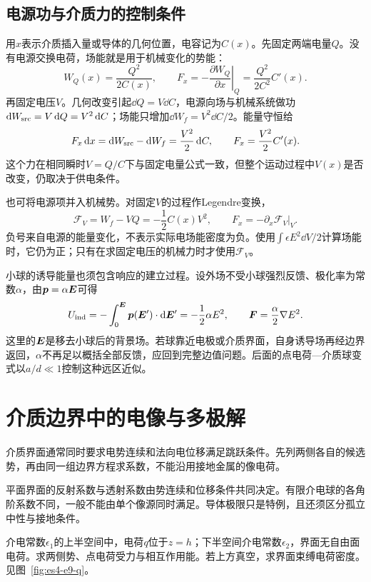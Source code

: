 \subsection{电源功与介质力的控制条件}\label{sec:es-energy-control}
用$x$表示介质插入量或导体的几何位置，电容记为$C(x)$。先固定两端电量$Q$。没有电源交换电荷，场能就是用于机械变化的势能：
\[W_Q(x)=\frac{Q^2}{2C(x)},\qquad
F_x=-\left.\frac{\partial W_Q}{\partial x}\right|_Q
=\frac{Q^2}{2C^2}C'(x).
\]
再固定电压$V$。几何改变引起$\dd Q=V\dd C$，电源向场与机械系统做功$\mathop{}\!\mathrm d W_{\rm src}=V\mathop{}\!\mathrm d Q=V^2\mathop{}\!\mathrm d C$；场能只增加$\dd W_f=V^2\dd C/2$。能量守恒给
\[F_x\mathop{}\!\mathrm d x=\mathop{}\!\mathrm d W_{\rm src}-\mathop{}\!\mathrm d W_f
=\frac{V^2}{2}\mathop{}\!\mathrm d C,
\qquad F_x=\frac{V^2}{2}C'(x).
\]
这个力在相同瞬时$V=Q/C$下与固定电量公式一致，但整个运动过程中$V(x)$是否改变，仍取决于供电条件。

也可将电源项并入机械势。对固定$V$的过程作Legendre变换，
\[\mathcal F_V=W_f-VQ=-\frac12C(x)V^2,
\qquad F_x=-\left.\partial_x\mathcal F_V\right|_V.
\]
负号来自电源的能量变化，不表示实际电场能密度为负。使用$\int\epsilon E^2\dd V/2$计算场能时，它仍为正；只有在求固定电压的机械力时才使用$\mathcal F_V$。

小球的诱导能量也须包含响应的建立过程。设外场不受小球强烈反馈、极化率为常数$\alpha$，由$\bm{p}=\alpha\bm{E}$可得
\[U_{\rm ind}=-\int_0^{\bm{E}}\bm{p}(\bm{E}')\cdot\mathop{}\!\mathrm d\bm{E}'
=-\frac12\alpha E^2,
\qquad \bm{F}=\frac\alpha2\nabla E^2.
\]
这里的$\bm{E}$是移去小球后的背景场。若球靠近电极或介质界面，自身诱导场再经边界返回，$\alpha$不再足以概括全部反馈，应回到完整边值问题。后面的点电荷—介质球变式以$a/d\ll1$控制这种远区近似。



\section{介质边界中的电像与多极解}\label{sec:es4-images}
介质界面通常同时要求电势连续和法向电位移满足跳跃条件。先列两侧各自的候选势，再由同一组边界方程求系数，不能沿用接地金属的像电荷。

平面界面的反射系数与透射系数由势连续和位移条件共同决定。有限介电球的各角阶系数不同，一般不能由单个像源同时满足。导体极限只是特例，且还须区分孤立中性与接地条件。

\begin{example}[介质平面上的点电荷]\label{ex:es4-e9}
介电常数$\epsilon_1$的上半空间中，电荷$q$位于$z=h$；下半空间介电常数$\epsilon_2$，界面无自由面电荷。求两侧势、点电荷受力与相互作用能。若上方真空，求界面束缚电荷密度。 见图~\ref{fig:es4-e9-q}。
\end{example}

